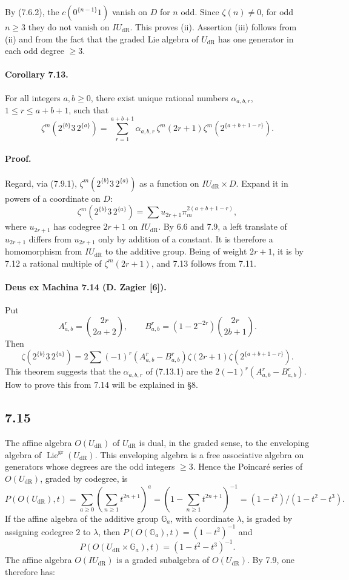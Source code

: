 \documentclass[10pt]{article}
\newcommand{\Ga}{\mathbb G_a}
\newcommand{\Lie}{\operatorname{Lie}}
\newcommand{\dR}{\mathrm{dR}}
\begin{document}
By (7.6.2), the $c(0^{\{n-1\}}1)$ vanish on $D$ for $n$ odd. Since $\zeta(n)\ne0$, for odd $n\geq3$ they do not vanish on $IU_{\dR}$. This proves (ii). Assertion (iii) follows from (ii) and from the fact that the graded Lie algebra of $U_{\dR}$ has one generator in each odd degree $\geq3$.

\paragraph{Corollary 7.13.}
For all integers $a,b\geq0$, there exist unique rational numbers $\alpha_{a,b,r}$, $1\leq r\leq a+b+1$, such that
\begin{equation}
\zeta^m(2^{\{b\}}3\,2^{\{a\}})=\sum_{r=1}^{a+b+1}\alpha_{a,b,r}\,\zeta^m(2r+1)\zeta^m(2^{\{a+b+1-r\}}).
\tag{7.13.1}
\end{equation}

\paragraph{Proof.}
Regard, via (7.9.1), $\zeta^m(2^{\{b\}}3\,2^{\{a\}})$ as a function on $IU_{\dR}\times D$. Expand it in powers of a coordinate on $D$:
\[
\zeta^m(2^{\{b\}}3\,2^{\{a\}})=\sum u_{2r+1}\pi_m^{2(a+b+1-r)},
\]
where $u_{2r+1}$ has codegree $2r+1$ on $IU_{\dR}$. By 6.6 and 7.9, a left translate of $u_{2r+1}$ differs from $u_{2r+1}$ only by addition of a constant. It is therefore a homomorphism from $IU_{\dR}$ to the additive group. Being of weight $2r+1$, it is by 7.12 a rational multiple of $\zeta^m(2r+1)$, and 7.13 follows from 7.11.

\paragraph{Deus ex Machina 7.14 (D. Zagier [6]).}
Put
\[
A^r_{a,b}=\binom{2r}{2a+2},\qquad
B^r_{a,b}=(1-2^{-2r})\binom{2r}{2b+1}.
\]
Then
\begin{equation}
\zeta(2^{\{b\}}3\,2^{\{a\}})=2\sum(-1)^r(A^r_{a,b}-B^r_{a,b})\zeta(2r+1)\zeta(2^{\{a+b+1-r\}}).
\tag{7.14.1}
\end{equation}
This theorem suggests that the $\alpha_{a,b,r}$ of (7.13.1) are the $2(-1)^r(A^r_{a,b}-B^r_{a,b})$. How to prove this from 7.14 will be explained in §8.

\subsection*{7.15}
The affine algebra $O(U_{\dR})$ of $U_{\dR}$ is dual, in the graded sense, to the enveloping algebra of $\Lie^{\mathrm{gr}}(U_{\dR})$. This enveloping algebra is a free associative algebra on generators whose degrees are the odd integers $\geq3$. Hence the Poincaré series of $O(U_{\dR})$, graded by codegree, is
\[
P(O(U_{\dR}),t)=\sum_{a\geq0}\left(\sum_{n\geq1}t^{2n+1}\right)^a
=\left(1-\sum_{n\geq1}t^{2n+1}\right)^{-1}
=(1-t^2)/(1-t^2-t^3).
\]
If the affine algebra of the additive group $\Ga$, with coordinate $\lambda$, is graded by assigning codegree $2$ to $\lambda$, then $P(O(\Ga),t)=(1-t^2)^{-1}$ and
\[
P(O(U_{\dR}\times\Ga),t)=(1-t^2-t^3)^{-1}.
\]
The affine algebra $O(IU_{\dR})$ is a graded subalgebra of $O(U_{\dR})$. By 7.9, one therefore has:
\end{document}
